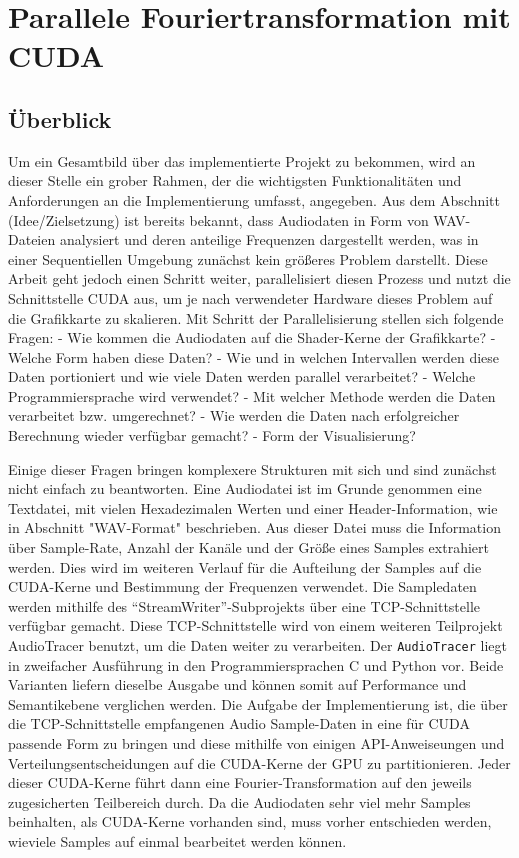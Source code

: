 
\section{Parallele Fouriertransformation mit CUDA} \label{CUDA_DSP}

\subsection{Überblick}
Um ein Gesamtbild über das implementierte Projekt zu bekommen, wird an dieser Stelle ein grober Rahmen, der die wichtigsten Funktionalitäten und Anforderungen an die Implementierung umfasst, angegeben.
Aus dem Abschnitt (Idee/Zielsetzung) ist bereits bekannt, dass Audiodaten in Form von WAV-Dateien analysiert und deren anteilige Frequenzen dargestellt werden, was in einer Sequentiellen Umgebung zunächst kein größeres Problem darstellt.
Diese Arbeit geht jedoch einen Schritt weiter, parallelisiert diesen Prozess und nutzt die Schnittstelle CUDA aus, um je nach verwendeter Hardware dieses Problem auf die Grafikkarte zu skalieren. 
Mit Schritt der Parallelisierung stellen sich folgende Fragen:
- Wie kommen die Audiodaten auf die Shader-Kerne der Grafikkarte?
- Welche Form haben diese Daten?
- Wie und in welchen Intervallen werden diese Daten portioniert und wie viele Daten werden parallel verarbeitet?
- Welche Programmiersprache wird verwendet?
- Mit welcher Methode werden die Daten verarbeitet bzw. umgerechnet?
- Wie werden die Daten nach erfolgreicher Berechnung wieder verfügbar gemacht?
- Form der Visualisierung?

Einige dieser Fragen bringen komplexere Strukturen mit sich und sind zunächst nicht einfach zu beantworten.
Eine Audiodatei ist im Grunde genommen eine Textdatei, mit vielen Hexadezimalen Werten und einer Header-Information, wie in Abschnitt "WAV-Format" beschrieben.
Aus dieser Datei muss die Information über Sample-Rate, Anzahl der Kanäle und der Größe eines Samples extrahiert werden. Dies wird im weiteren Verlauf für die Aufteilung der Samples auf die CUDA-Kerne und Bestimmung der Frequenzen verwendet.
Die Sampledaten werden mithilfe des \enquote{StreamWriter}-Subprojekts über eine TCP-Schnittstelle verfügbar gemacht. Diese TCP-Schnittstelle wird von einem weiteren Teilprojekt AudioTracer benutzt, um die Daten weiter zu verarbeiten.
Der \texttt{AudioTracer} liegt in zweifacher Ausführung in den Programmiersprachen C und Python vor. Beide Varianten liefern dieselbe Ausgabe und können somit auf Performance und Semantikebene verglichen werden. 
Die Aufgabe der Implementierung ist, die über die TCP-Schnittstelle empfangenen Audio Sample-Daten in eine für CUDA passende Form zu bringen und diese mithilfe von einigen API-Anweiseungen und Verteilungsentscheidungen auf die CUDA-Kerne der GPU zu partitionieren.
Jeder dieser CUDA-Kerne führt dann eine Fourier-Transformation auf den jeweils zugesicherten Teilbereich durch. Da die Audiodaten sehr viel mehr Samples beinhalten, als CUDA-Kerne vorhanden sind, muss vorher entschieden werden, wieviele Samples auf einmal bearbeitet werden können.

